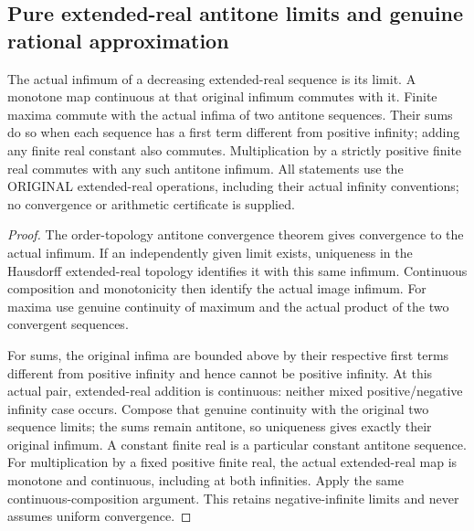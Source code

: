 \subsection{Pure extended-real antitone limits and genuine rational approximation}

\begin{lemma}
\label{analysis:actual-ereal-antitone-infima}
\leanok
{}
The actual infimum of a decreasing extended-real sequence is its limit. A
monotone map continuous at that original infimum commutes with it. Finite
maxima commute with the actual infima of two antitone sequences. Their sums
do so when each sequence has a first term different from positive infinity;
adding any finite real constant also commutes. Multiplication by a strictly
positive finite real commutes with any such antitone infimum. All statements
use the ORIGINAL extended-real operations, including their actual infinity
conventions; no convergence or arithmetic certificate is supplied.
\end{lemma}
\begin{proof}
The order-topology antitone convergence theorem gives convergence to the
actual infimum. If an independently given limit exists, uniqueness in the
Hausdorff extended-real topology identifies it with this same infimum.
Continuous composition and monotonicity then identify the actual image
infimum. For maxima use genuine continuity of maximum and the actual product
of the two convergent sequences.

For sums, the original infima are bounded above by their respective first
terms different from positive infinity and hence cannot be positive infinity. At this actual pair,
extended-real addition is continuous: neither mixed positive/negative infinity
case occurs. Compose that genuine continuity with the original two sequence
limits; the sums remain antitone, so uniqueness gives exactly their original
infimum. A constant finite real is a particular constant antitone sequence.
For multiplication by a fixed positive finite real, the actual extended-real
map is monotone and continuous, including at both infinities. Apply the same
continuous-composition argument. This retains negative-infinite limits and
never assumes uniform convergence.
\end{proof}

